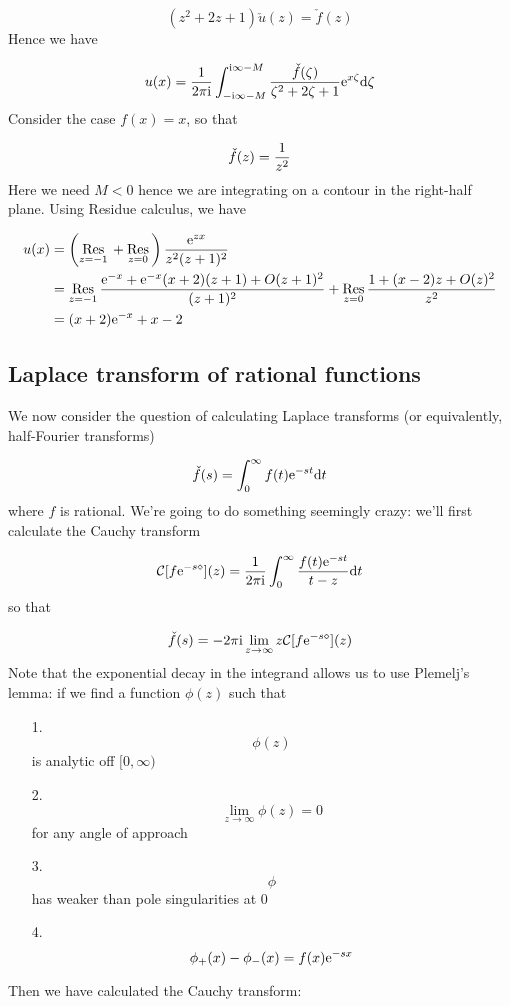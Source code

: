 \documentclass[12pt,a4paper]{article}
\def\D{ {\rm d} }
\def\I{ {\rm i} }
\def\E{ {\rm e} }
\def\CC{ {\cal C} }
\def\Res_#1{\underset{#1}{\rm Res}\,}
\begin{document}
\[
(z^2 + 2z + 1) \check u(z) = \check f(z)
\]
Hence we have

\[
u(x) = {1 \over 2 \pi \I}\int_{-\I\infty-M}^{\I \infty-M} {\check f(\zeta) \over \zeta^2 + 2\zeta+1} \E^{x \zeta} \D \zeta
\]
Consider the case $f(x) = x$, so that

\[
\check f(z) = {1 \over z^2}
\]
Here we need $M < 0$ hence we are integrating on a contour in the right-half plane.  Using Residue calculus, we have


\begin{align*}
u(x) &= \left(\Res_{z = -1} + \Res_{z=0}\right) {\E^{z x} \over z^2 (z +1)^2} \\
&= \Res_{z = -1}  {\E^{-x} +\E^{-x}(x+2) (z+1) +O(z+1)^2 \over  (z +1)^2} + \Res_{z=0} {1 + (x-2) z +O(z)^2 \over  z^2}  \\
 &= (x+2)\E^{-x} + x-2
 \end{align*}
\subsection{Laplace transform of rational functions}
We now consider the question of calculating Laplace transforms (or equivalently, half-Fourier transforms)

\[
\check f(s) = \int_0^\infty f(t) \E^{-s t} \D t
\]
where $f$ is rational. We're going to do something seemingly crazy: we'll first calculate the Cauchy transform

\[
\CC[f \E^{-s \diamond}](z) = {1 \over 2 \pi \I} \int_0^\infty {f(t) \E^{-s t} \over t- z} \D t
\]
so that

\[
\check f(s) = -2 \pi \I\lim_{z \rightarrow \infty}  z \CC[f \E^{-s \diamond}](z)
\]
Note that the exponential decay in the integrand allows us to use Plemelj's lemma: if we find a function $\phi(z)$ such that

\begin{itemize}
\item[1. ] \[
\phi(z)
\]
is analytic off $[0,\infty)$


\item[2. ] \[
\lim_{z \rightarrow \infty} \phi(z) = 0
\]
for any angle of approach


\item[3. ] \[
\phi
\]
has weaker than pole singularities at 0


\item[4. ] \[
\phi_+(x) - \phi_-(x) = f(x) \E^{-s x}
\]
\end{itemize}
Then we have calculated the Cauchy transform:
\end{document}
